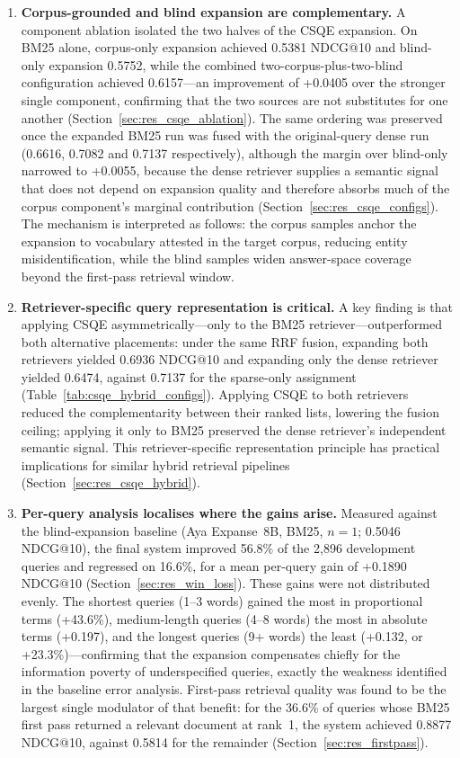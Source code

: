 \begin{enumerate}[label=\roman*.]
    \item \textbf{Corpus-grounded and blind expansion are complementary.} A component ablation isolated the two halves of the CSQE expansion. On BM25 alone, corpus-only expansion achieved 0.5381 NDCG@10 and blind-only expansion 0.5752, while the combined two-corpus-plus-two-blind configuration achieved 0.6157---an improvement of +0.0405 over the stronger single component, confirming that the two sources are not substitutes for one another (Section~\ref{sec:res_csqe_ablation}). The same ordering was preserved once the expanded BM25 run was fused with the original-query dense run (0.6616, 0.7082 and 0.7137 respectively), although the margin over blind-only narrowed to +0.0055, because the dense retriever supplies a semantic signal that does not depend on expansion quality and therefore absorbs much of the corpus component's marginal contribution (Section~\ref{sec:res_csqe_configs}). The mechanism is interpreted as follows: the corpus samples anchor the expansion to vocabulary attested in the target corpus, reducing entity misidentification, while the blind samples widen answer-space coverage beyond the first-pass retrieval window.
    \item \textbf{Retriever-specific query representation is critical.} A key finding is that applying CSQE asymmetrically---only to the BM25 retriever---outperformed both alternative placements: under the same RRF fusion, expanding both retrievers yielded 0.6936 NDCG@10 and expanding only the dense retriever yielded 0.6474, against 0.7137 for the sparse-only assignment (Table~\ref{tab:csqe_hybrid_configs}). Applying CSQE to both retrievers reduced the complementarity between their ranked lists, lowering the fusion ceiling; applying it only to BM25 preserved the dense retriever's independent semantic signal. This retriever-specific representation principle has practical implications for similar hybrid retrieval pipelines (Section~\ref{sec:res_csqe_hybrid}).
    \item \textbf{Per-query analysis localises where the gains arise.} Measured against the blind-expansion baseline (Aya Expanse~8B, BM25, $n=1$; 0.5046 NDCG@10), the final system improved 56.8\% of the 2,896 development queries and regressed on 16.6\%, for a mean per-query gain of +0.1890 NDCG@10 (Section~\ref{sec:res_win_loss}). These gains were not distributed evenly. The shortest queries (1--3 words) gained the most in proportional terms (+43.6\%), medium-length queries (4--8 words) the most in absolute terms (+0.197), and the longest queries (9+ words) the least (+0.132, or +23.3\%)---confirming that the expansion compensates chiefly for the information poverty of underspecified queries, exactly the weakness identified in the baseline error analysis. First-pass retrieval quality was found to be the largest single modulator of that benefit: for the 36.6\% of queries whose BM25 first pass returned a relevant document at rank~1, the system achieved 0.8877 NDCG@10, against 0.5814 for the remainder (Section~\ref{sec:res_firstpass}).

\end{enumerate}
